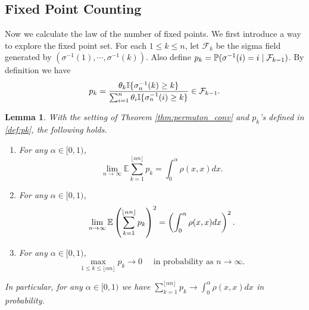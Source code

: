 \documentclass[10pt]{article}
\newtheorem{lem}[thm]{Lemma}
\numberwithin{equation}{section}
\begin{document}
\subsection{Fixed Point Counting}
    Now we calculate the law of the number of fixed points. We first introduce a way to explore the fixed point set. For each $1\leq k\leq n$, let $\mathcal F_k$ be the sigma field generated by $(\sigma^{-1}(1),\cdots, \sigma^{-1}(k))$. Also define
    $p_k=\mathbb P(\sigma^{-1}(i)=i\mid {\mathcal{F}}_{k-1})$. By definition we have
    \begin{equation}\label{def:pk}
        p_k=\frac{\theta_k\mathbb I\{\sigma^{-1}_n(k)\ge k\}}{\sum_{i=1}^n \theta_i \mathbb I\{\sigma^{-1}_n(i)\ge k\}} \in {\mathcal{F}}_{k-1}.
    \end{equation}

    \begin{lem}\label{lem:sum-p-limit}
        With the setting of Theorem \ref{thm:permuton_conv} and $p_k$'s defined in \eqref{def:pk}, the following holds.
        \begin{enumerate}
            \item For any $\alpha \in [0,1)$,
            \begin{equation}\label{eq:p-firstmoment}
                \lim_{n\to \infty} \mathbb E  \sum_{k=1}^{\lfloor \alpha n \rfloor} p_k = \int_0^\alpha \rho(x,x) dx.
            \end{equation}
            \item For any $\alpha \in [0,1)$,
            \begin{equation}\label{eq:p-secondmoment}
                \lim_{n\to \infty} \mathbb E \left( \sum_{k=1}^{\lfloor \alpha n \rfloor} p_k \right) ^2= \left( \int_0^\alpha \rho(x,x) dx \right)^2.
            \end{equation}
            \item For any $\alpha \in [0,1)$,
            \begin{equation}\label{eq:max-p}
                \max_{1\leq k\leq \lfloor \alpha n\rfloor} p_k \to 0 \quad \mbox{ in probability as } n \to \infty.
            \end{equation}
        \end{enumerate}
        In particular, for any $\alpha\in [0,1)$ we have $\sum_{k=1}^{\lfloor \alpha n \rfloor} p_k\to \int_0^\alpha \rho(x,x) dx $ in probability.
    \end{lem}
\end{document}
